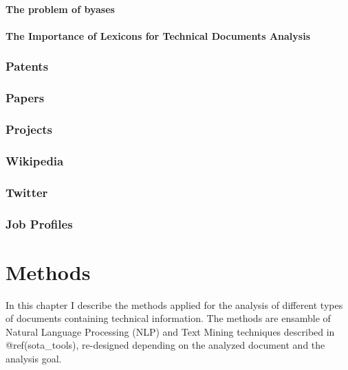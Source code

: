 \documentclass[]{book}
\theoremstyle{definition}
\theoremstyle{definition}
\theoremstyle{definition}
\theoremstyle{remark}
\begin{document}
\subsubsection{The problem of byases}\label{sotadocumentsunderstandbyas}

\subsubsection{The Importance of Lexicons for Technical Documents
Analysis}\label{sotadocumentsunderstandlexicons}

\subsection{Patents}\label{sotadocumentspatents}

\subsection{Papers}\label{sotadocumentspapers}

\subsection{Projects}\label{sotadocumentsprojects}

\subsection{Wikipedia}\label{sotadocumentswiki}

\subsection{Twitter}\label{sotadocumentstwitter}

\subsection{Job Profiles}\label{sotadocumentsjobs}

\chapter{Methods}\label{methods}

In this chapter I describe the methods applied for the analysis of
different types of documents containing technical information. The
methods are ensamble of Natural Language Processing (NLP) and Text
Mining techniques described in @ref(sota\_tools), re-designed depending
on the analyzed document and the analysis goal.
\end{document}
